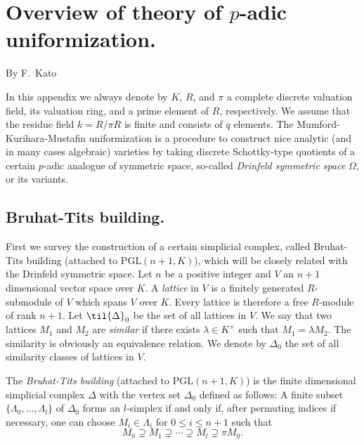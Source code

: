 \chapter{Overview of theory of $p$-adic uniformization.}
\renewcommand{\thechapter}{\Alph{chapter}}

\vspace{1ex}
\begin{center}
By {\sc F.\ Kato}
\end{center}

\vspace{2ex}
In this appendix we always denote by $K$, $R$, and $\pi$ a complete 
discrete valuation field, its valuation ring, and a prime element of
$R$, respectively. 
We assume that the residue field $k=R/\pi R$ is finite and consists of 
$q$ elements.
The Mumford-Kurihara-Mustafin uniformization is a procedure to
construct nice analytic (and in many cases algebraic) varieties by
taking discrete Schottky-type quotients of a certain $p$-adic analogue
of symmetric space, so-called {\it Drinfeld symmetric space} $\Omega$, 
or its variants.

%
\section{Bruhat-Tits building.}
%

First we survey the construction of a certain simplicial complex, called 
Bruhat-Tits building (attached to $\mathrm{PGL}(n+1,K)$), which will be 
closely related with the Drinfeld symmetric space.
Let $n$ be a positive integer and $V$ an $n+1$ dimensional vector space
over $K$.
A {\it lattice} in $V$ is a finitely generated 
$R$-submodule of $V$ which spans $V$ over $K$. 
Every lattice is therefore a free $R$-module of rank $n+1$.
Let $\til{\Delta}_0$ be the set of all lattices in $V$. 
We say that two lattices $M_1$ and $M_2$ are {\it similar} if there
exists $\lambda\in K^{\times}$ such that $M_1=\lambda M_2$.
The similarity is obviously an equivalence relation.
We denote by
$\Delta_0$ the set of all similarity classes of lattices in $V$.

\begin{appdfn}
The {\it Bruhat-Tits building} (attached to $\mathrm{PGL}(n+1,K)$) is
the finite dimensional simplicial complex $\Delta$ with the vertex set
$\Delta_0$ defined as follows: A finite subset $\{\Lambda_0,\ldots,
\Lambda_l\}$ of $\Delta_0$ forms an $l$-simplex if and only if, after 
permuting indices if necessary, one can choose $M_i\in\Lambda_i$ for 
$0\leq i\leq n+1$ such that
$$
M_0\supsetneq M_1\supsetneq\cdots\supsetneq M_l\supsetneq\pi M_0.
$$
\end{appdfn}


